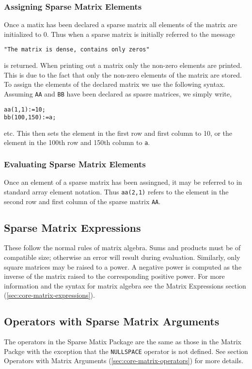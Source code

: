 \subsubsection{Assigning Sparse Matrix Elements}
Once a matix has been declared a sparse matrix all elements of the
matrix are initialized to 0. Thus when a sparse matrix is initially
referred to the message
\begin{verbatim}
"The matrix is dense, contains only zeros"
\end{verbatim}
is returned. When printing out a matrix only the non-zero elements are
printed. This is due to the fact that only the non-zero elements of the
matrix are stored.
To assign the elements of the declared matrix we use the following
syntax. Assuming \texttt{AA} and \texttt{BB} have been declared as spasre
matrices, we simply write,
\begin{verbatim}
aa(1,1):=10;
bb(100,150):=a;
\end{verbatim}
etc. This then sets the element in the first row and first column to 10,
or the element in the 100th row and 150th column to \texttt{a}.

\subsubsection{Evaluating Sparse Matrix Elements}
Once an element of a sparse matrix has been assingned, it may be referred
to in standard array element notation. Thus \texttt{aa(2,1)} refers to the
element in the second row and first column of the sparse matrix \texttt{AA}.

\subsection{Sparse Matrix Expressions}
These follow the normal rules of matrix algebra. Sums and products must
be of compatible size; otherwise an error will result during evaluation.
Similarly, only square matrices may be raised to a power.
A negative power is computed as the inverse of the matrix raised to the
corresponding positive power. For more information and the syntax for
matrix algebra see the Matrix Expressions section (\ref{sec:core-matrix-expressions}).

\subsection{Operators with Sparse Matrix Arguments}
The operators in the Sparse Matix Package are the same as those in the
Matrix Packge with the exception that the \texttt{NULLSPACE} operator is
not defined. See section Operators with Matrix Arguments
(\ref{sec:core-matrix-operators}) for more details.

